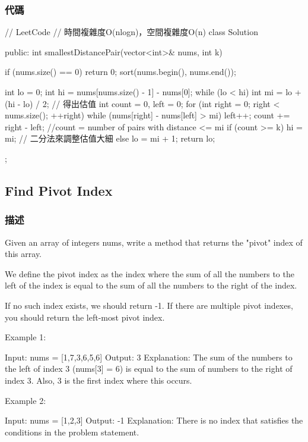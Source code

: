\subsubsection{代碼}
\begin{Code}
// LeetCode
// 時間複雜度O(nlogn)，空間複雜度O(n)
class Solution {
public:
    int smallestDistancePair(vector<int>& nums, int k) {
        if (nums.size() == 0) return 0;
        sort(nums.begin(), nums.end());

        int lo = 0;
        int hi = nums[nums.size() - 1] - nums[0];
        while (lo < hi) {
            int mi = lo + (hi - lo) / 2; // 得出估值
            int count = 0, left = 0;
            for (int right = 0; right < nums.size(); ++right) {
                while (nums[right] - nums[left] > mi) left++;
                count += right - left;
            }
            //count = number of pairs with distance <= mi
            if (count >= k) hi = mi; // 二分法來調整估值大細
            else lo = mi + 1;
        }
        return lo;
    }
};
\end{Code}

\subsection{Find Pivot Index}
\label{sec:find-pivot-index}

\subsubsection{描述}
Given an array of integers nums, write a method that returns the "pivot" index of this array.

We define the pivot index as the index where the sum of all the numbers to the left of the index is equal to the sum of all the numbers to the right of the index.

If no such index exists, we should return -1. If there are multiple pivot indexes, you should return the left-most pivot index.

Example 1:
\begin{Code}
Input: nums = [1,7,3,6,5,6]
Output: 3
Explanation:
The sum of the numbers to the left of index 3 (nums[3] = 6) is equal to the sum of numbers to the right of index 3.
Also, 3 is the first index where this occurs.
\end{Code}

Example 2:
\begin{Code}
Input: nums = [1,2,3]
Output: -1
Explanation:
There is no index that satisfies the conditions in the problem statement.
\end{Code}

